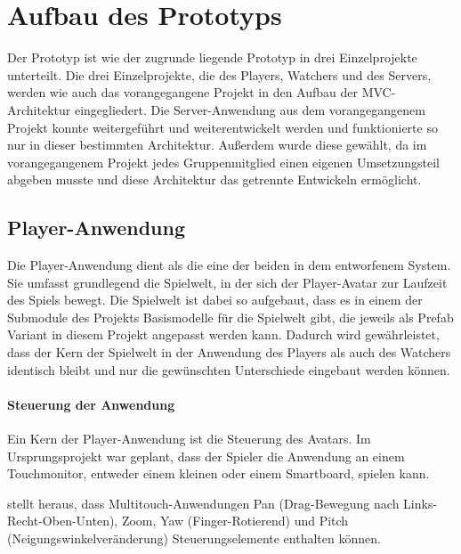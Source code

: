 \section{Aufbau des Prototyps}
Der Prototyp ist wie der zugrunde liegende Prototyp in drei Einzelprojekte unterteilt. Die drei Einzelprojekte, die des Players, Watchers und des Servers, werden wie auch das vorangegangene Projekt in den Aufbau der \ac{MVC}-Architektur eingegliedert. Die Server-Anwendung aus dem vorangegangenem Projekt konnte weitergeführt und weiterentwickelt werden und funktionierte so nur in dieser bestimmten Architektur. Außerdem wurde diese gewählt, da im vorangegangenem Projekt jedes Gruppenmitglied einen eigenen Umsetzungsteil abgeben musste und diese Architektur das getrennte Entwickeln ermöglicht.

\subsection{Player-Anwendung}
Die Player-Anwendung dient als die eine der beiden  in dem entworfenem System. Sie umfasst grundlegend die Spielwelt, in der sich der Player-Avatar zur Laufzeit des Spiels bewegt. Die Spielwelt ist dabei so aufgebaut, dass es in einem der Submodule des Projekts Basismodelle für die Spielwelt gibt, die jeweils als Prefab Variant in diesem Projekt angepasst werden kann. Dadurch wird gewährleistet, dass der Kern der Spielwelt in der Anwendung des Players als auch des Watchers identisch bleibt und nur die gewünschten Unterschiede eingebaut werden können.

\paragraph{Steuerung der Anwendung}
Ein Kern der Player-Anwendung ist die Steuerung des Avatars. Im Ursprungsprojekt war geplant, dass der Spieler die Anwendung an einem Touchmonitor, entweder einem kleinen oder einem Smartboard, spielen kann.

\cite{reinhard_augmented_2022} stellt heraus, dass Multitouch-Anwendungen Pan (Drag-Bewegung nach Links-Recht-Oben-Unten), Zoom, Yaw (Finger-Rotierend) und Pitch (Neigungswinkelveränderung) Steuerungselemente enthalten können. 

